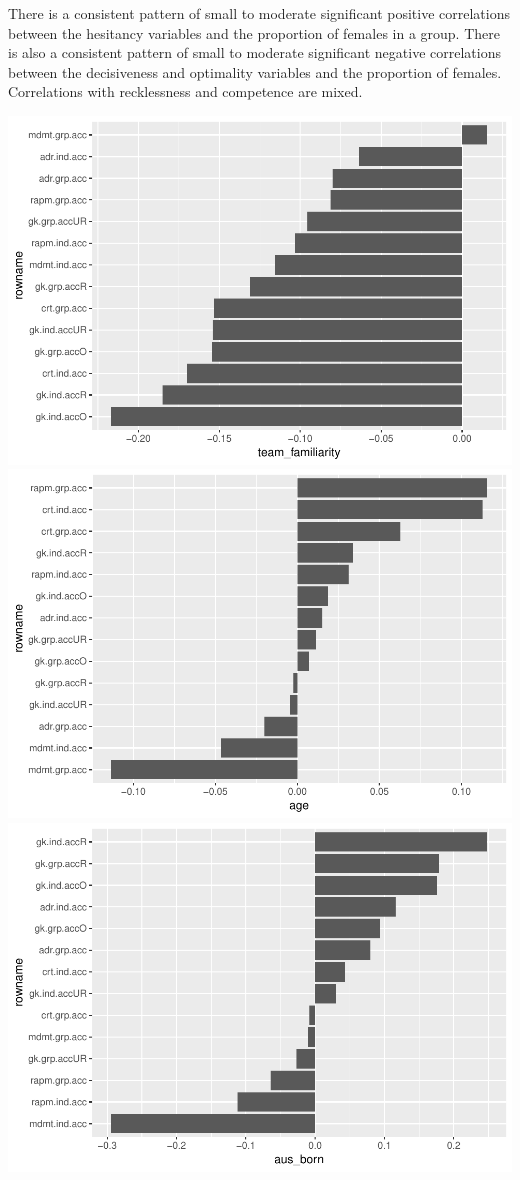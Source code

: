 \documentclass[]{article}
\begin{document}
There is a consistent pattern of small to moderate significant positive
correlations between the hesitancy variables and the proportion of
females in a group. There is also a consistent pattern of small to
moderate significant negative correlations between the decisiveness and
optimality variables and the proportion of females. Correlations with
recklessness and competence are mixed.

\includegraphics{corr_analyses_files/figure-latex/unnamed-chunk-1-1.pdf}
\includegraphics{corr_analyses_files/figure-latex/unnamed-chunk-1-2.pdf}
\includegraphics{corr_analyses_files/figure-latex/unnamed-chunk-1-3.pdf}
\end{document}

